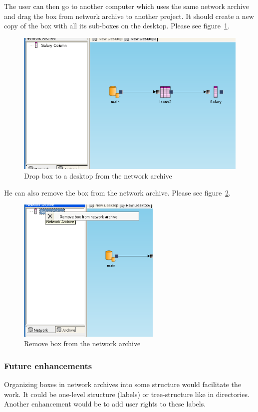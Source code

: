\documentclass[a4paper,12pt]{book}
\begin{document}
The user can then go to another computer which uses the same network archive and drag the box from network archive to another project. It should create a new copy of the box with all its sub-boxes on the desktop. Please see figure~\ref{fig:dragFromNAToDesktop}.
\begin{figure}
	\includegraphics[width=1\textwidth]{network_archive_drop_to_desktop}
	\caption{Drop box to a desktop from the network archive}
	\label{fig:dragFromNAToDesktop}
\end{figure}

He can also remove the box from the network archive. Please see figure~\ref{fig:removeFromNA}.
\begin{figure}
	\centering
	\includegraphics[height=7cm]{network_archive_remove_box}
	\caption{Remove box from the network archive}
	\label{fig:removeFromNA}
\end{figure}

\subsubsection{Future enhancements}
Organizing boxes in network archives into some structure would facilitate the work. It could be one-level structure (labels) or tree-structure like in directories. Another enhancement would be to add user rights to these labels.
\end{document}
